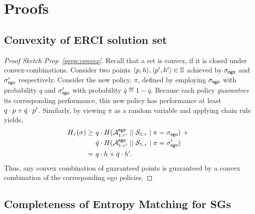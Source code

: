 \section{Proofs}\label{sec:proofs}
\subsection{Convexity of ERCI solution set}
\begin{proof}[Proof Sketch Prop~\ref{prop:convex}]
  Recall that a set is convex, if it is closed under
  convex-combinations\footnotemark. Consider two points
  $\langle p, h \rangle, \langle p', h' \rangle \in
  \mathbb{S}$ achieved by ${\sigma_{\mathsf{ego}}}$ and ${\sigma'_{\mathsf{ego}}}$
  respectively. Consider the new policy, $\pi$, defined by employing
  ${\sigma_{\mathsf{ego}}}$ with probability $q$ and ${\sigma'_{\mathsf{ego}}}$ with
  probability $\bar{q} \eqdef 1 - q$.  Because each policy
  \emph{guarantees} its corresponding performance, this new policy has
  performance at least $q\cdot p + \bar{q}\cdot p'$.  Similarly,
  by viewing $\pi$ as a random variable and applying chain rule
  yields,
  \begin{equation}
    \begin{split}
      H_\tau(\sigma)
      \geq &~q \cdot H( {\mathcal{A}}^{\mathsf{ego}}_{1:\tau'} \mid\mid {\mathcal{S}}_{1:\tau} \mid \pi={\sigma_{\mathsf{ego}}})~+\\
      &~\bar{q}  \cdot H( {\mathcal{A}}^{\mathsf{ego}}_{1:\tau'} \mid\mid {\mathcal{S}}_{1:\tau} \mid \pi={\sigma'_{\mathsf{ego}}})\\
      =&~q\cdot h + \bar{q}\cdot h'.
    \end{split}
  \end{equation}
  Thus, any convex combination of guaranteed points is guaranteed by
  a convex combination of the corresponding ego policies.
\end{proof}


\subsection{Completeness of Entropy Matching for SGs}


